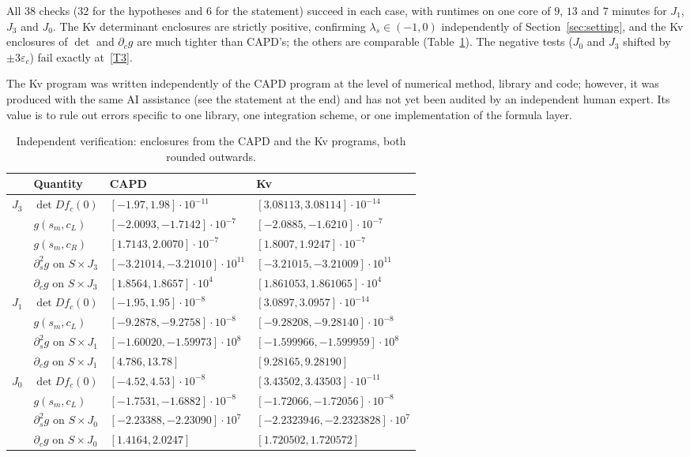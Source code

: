 \documentclass[11pt]{amsart}
\theoremstyle{definition}
\theoremstyle{remark}
\begin{document}
All $38$ checks ($32$ for the hypotheses and $6$ for the statement) succeed in each case, with runtimes on one core of $9$, $13$ and $7$ minutes for $J_1$,
$J_3$ and $J_0$. The Kv determinant enclosures are strictly positive, confirming $\lambda_s\in(-1,0)$
independently of Section~\ref{sec:setting}, and the Kv enclosures of $\det$ and $\partial_cg$ are much tighter
than CAPD's; the others are comparable (Table~\ref{tab:kv}). The negative tests ($J_0$ and $J_3$ shifted by
$\pm3\varepsilon_c$) fail exactly at~\ref{T3}.

The Kv program was written independently of the CAPD program at the level of numerical method, library and
code; however, it was produced with the same AI assistance (see the statement at the end) and has not yet been
audited by an independent human expert. Its value is to rule out errors specific to one library, one
integration scheme, or one implementation of the formula layer.

\begin{table}[t]
\centering
\footnotesize
\begin{tabular}{@{}llll@{}}
\toprule
& Quantity & CAPD & Kv\\
\midrule
$J_3$ & $\det Df_c(0)$ & $[-1.97,1.98]\cdot10^{-11}$ & $[3.08113,3.08114]\cdot10^{-14}$\\
& $g(s_m,c_L)$ & $[-2.0093,-1.7142]\cdot10^{-7}$ & $[-2.0885,-1.6210]\cdot10^{-7}$\\
& $g(s_m,c_R)$ & $[1.7143,2.0070]\cdot10^{-7}$ & $[1.8007,1.9247]\cdot10^{-7}$\\
& $\partial_s^2g$ on $S\times J_3$ & $[-3.21014,-3.21010]\cdot10^{11}$ & $[-3.21015,-3.21009]\cdot10^{11}$\\
& $\partial_cg$ on $S\times J_3$ & $[1.8564,1.8657]\cdot10^{4}$ & $[1.861053,1.861065]\cdot10^{4}$\\
\midrule
$J_1$ & $\det Df_c(0)$ & $[-1.95,1.95]\cdot10^{-8}$ & $[3.0897,3.0957]\cdot10^{-14}$\\
& $g(s_m,c_L)$ & $[-9.2878,-9.2758]\cdot10^{-8}$ & $[-9.28208,-9.28140]\cdot10^{-8}$\\
& $\partial_s^2g$ on $S\times J_1$ & $[-1.60020,-1.59973]\cdot10^{8}$ & $[-1.599966,-1.599959]\cdot10^{8}$\\
& $\partial_cg$ on $S\times J_1$ & $[4.786,13.78]$ & $[9.28165,9.28190]$\\
\midrule
$J_0$ & $\det Df_c(0)$ & $[-4.52,4.53]\cdot10^{-8}$ & $[3.43502,3.43503]\cdot10^{-11}$\\
& $g(s_m,c_L)$ & $[-1.7531,-1.6882]\cdot10^{-8}$ & $[-1.72066,-1.72056]\cdot10^{-8}$\\
& $\partial_s^2g$ on $S\times J_0$ & $[-2.23388,-2.23090]\cdot10^{7}$ & $[-2.2323946,-2.2323828]\cdot10^{7}$\\
& $\partial_cg$ on $S\times J_0$ & $[1.4164,2.0247]$ & $[1.720502,1.720572]$\\
\bottomrule
\end{tabular}
\vspace{4pt}
\caption{Independent verification: enclosures from the CAPD and the Kv programs, both rounded outwards.}
\label{tab:kv}
\end{table}
\end{document}
